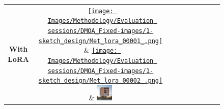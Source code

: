 \begin{figure}[H]
{\begin{tabular}{c c c c c c c c}
    \shortstack{\textbf{With}\\\textbf{LoRA}} & \href{https://github.com/matijspeeters/Thesis_Lora/blob/main/Results/Architect%20A/Sketch%20design/Met_lora_00001_.png}{\texttt{[image: Images/Methodology/Evaluation sessions/DMOA\_Fixed-images/1-sketch\_design/Met\_lora\_00001\_.png]}} & \href{https://github.com/matijspeeters/Thesis_Lora/blob/main/Results/Architect%20A/Sketch%20design/Met_lora_00002_.png}{\texttt{[image: Images/Methodology/Evaluation sessions/DMOA\_Fixed-images/1-sketch\_design/Met\_lora\_00002\_.png]}} &
    \includegraphics[width=0.12\textwidth]{Images/Methodology/Evaluation sessions/DMOA_Fixed-images/1-sketch_design/Met_lora_00017_ (2).png} &
    \includegraphics[width=0.12\textwidth]{Images/Methodology/Evaluation sessions/DMOA_Fixed-images/1-sketch_design/Met_lora_00029_.png} &
    \includegraphics[width=0.12\textwidth]{Images/Methodology/Evaluation sessions/DMOA_Fixed-images/1-sketch_design/Met_lora_00039_.png} &
    \includegraphics[width=0.12\textwidth]{Images/Methodology/Evaluation sessions/DMOA_Fixed-images/1-sketch_design/Met_lora_00043_ (1).png} &
    \includegraphics[width=0.12\textwidth]{Images/Methodology/Evaluation sessions/DMOA_Fixed-images/1-sketch_design/Met_lora_00058_.png} \\


\end{tabular}}
\end{figure}
